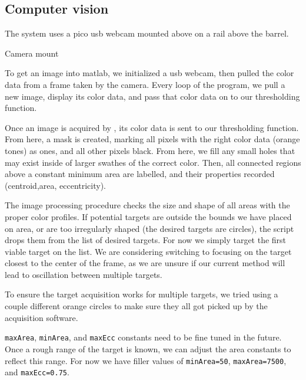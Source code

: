 ﻿\subsection{Computer vision}

The system uses a pico usb webcam mounted above on a rail above the barrel.
  
Camera mount

To get an image into matlab, we initialized a usb webcam, then pulled the color data from a frame taken by the camera. Every loop of the program, we pull a new image, display its color data, and pass that color data on to our thresholding function.

Once an image is acquired by \Matlab, its color data is sent to our thresholding function. From here, a mask is created, marking all pixels with the right color data (orange tones) as ones, and all other pixels black. From here, we fill any small holes that may exist inside of larger swathes of the correct color. Then, all connected regions above a constant minimum area are labelled, and their properties recorded (centroid,area, eccentricity). 

The image processing procedure checks the size and shape of all areas with the proper color profiles. If potential targets are outside the bounds we have placed on area, or are too irregularly shaped (the desired targets are circles), the script drops them from the list of desired targets. For now we simply target the first viable target on the list. We are considering switching to focusing on the target closest to the center of the frame, as we are unsure if our current method will lead to oscillation between multiple targets.

To ensure the target acquisition works for multiple targets, we tried using a couple different orange circles to make sure they all got picked up by the acquisition software. 

\lstinline{maxArea}, \lstinline{minArea}, and \lstinline{maxEcc} constants need to be fine tuned in the future. Once a rough range of the target is known, we can adjust the area constants to reflect this range. For now we have filler values of \lstinline{minArea=50}, \lstinline{maxArea=7500}, and \lstinline{maxEcc=0.75}.

